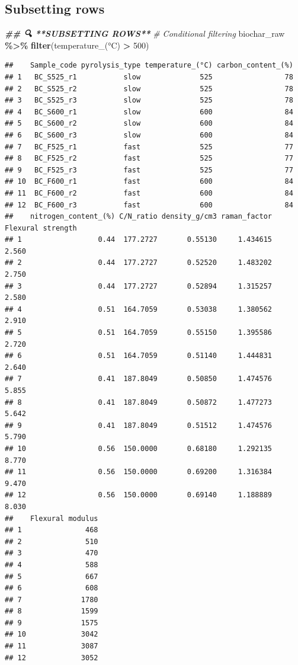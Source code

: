 \documentclass[
]{article}
\newenvironment{Shaded}{\begin{snugshade}}{\end{snugshade}}
\newcommand{\AttributeTok}[1]{\textcolor[rgb]{0.13,0.29,0.53}{#1}}
\newcommand{\CommentTok}[1]{\textcolor[rgb]{0.56,0.35,0.01}{\textit{#1}}}
\newcommand{\DecValTok}[1]{\textcolor[rgb]{0.00,0.00,0.81}{#1}}
\newcommand{\DocumentationTok}[1]{\textcolor[rgb]{0.56,0.35,0.01}{\textbf{\textit{#1}}}}
\newcommand{\FunctionTok}[1]{\textcolor[rgb]{0.13,0.29,0.53}{\textbf{#1}}}
\newcommand{\NormalTok}[1]{#1}
\newcommand{\SpecialCharTok}[1]{\textcolor[rgb]{0.81,0.36,0.00}{\textbf{#1}}}
\newcommand{\StringTok}[1]{\textcolor[rgb]{0.31,0.60,0.02}{#1}}
\begin{document}
\subsection{Subsetting rows}\label{subsetting-rows}

\begin{Shaded}
\begin{Highlighting}[]
\DocumentationTok{\#\# 🔍 **SUBSETTING ROWS**}
\CommentTok{\# Conditional filtering}
\NormalTok{biochar\_raw }\SpecialCharTok{\%\textgreater{}\%} \FunctionTok{filter}\NormalTok{(}\StringTok{\textasciigrave{}}\AttributeTok{temperature\_(°C)}\StringTok{\textasciigrave{}} \SpecialCharTok{\textgreater{}} \DecValTok{500}\NormalTok{)}
\end{Highlighting}
\end{Shaded}

\begin{verbatim}
##    Sample_code pyrolysis_type temperature_(°C) carbon_content_(%)
## 1   BC_S525_r1           slow              525                 78
## 2   BC_S525_r2           slow              525                 78
## 3   BC_S525_r3           slow              525                 78
## 4   BC_S600_r1           slow              600                 84
## 5   BC_S600_r2           slow              600                 84
## 6   BC_S600_r3           slow              600                 84
## 7   BC_F525_r1           fast              525                 77
## 8   BC_F525_r2           fast              525                 77
## 9   BC_F525_r3           fast              525                 77
## 10  BC_F600_r1           fast              600                 84
## 11  BC_F600_r2           fast              600                 84
## 12  BC_F600_r3           fast              600                 84
##    nitrogen_content_(%) C/N_ratio density_g/cm3 raman_factor Flexural strength
## 1                  0.44  177.2727       0.55130     1.434615             2.560
## 2                  0.44  177.2727       0.52520     1.483202             2.750
## 3                  0.44  177.2727       0.52894     1.315257             2.580
## 4                  0.51  164.7059       0.53038     1.380562             2.910
## 5                  0.51  164.7059       0.55150     1.395586             2.720
## 6                  0.51  164.7059       0.51140     1.444831             2.640
## 7                  0.41  187.8049       0.50850     1.474576             5.855
## 8                  0.41  187.8049       0.50872     1.477273             5.642
## 9                  0.41  187.8049       0.51512     1.474576             5.790
## 10                 0.56  150.0000       0.68180     1.292135             8.770
## 11                 0.56  150.0000       0.69200     1.316384             9.470
## 12                 0.56  150.0000       0.69140     1.188889             8.030
##    Flexural modulus
## 1               468
## 2               510
## 3               470
## 4               588
## 5               667
## 6               608
## 7              1780
## 8              1599
## 9              1575
## 10             3042
## 11             3087
## 12             3052
\end{verbatim}
\end{document}
